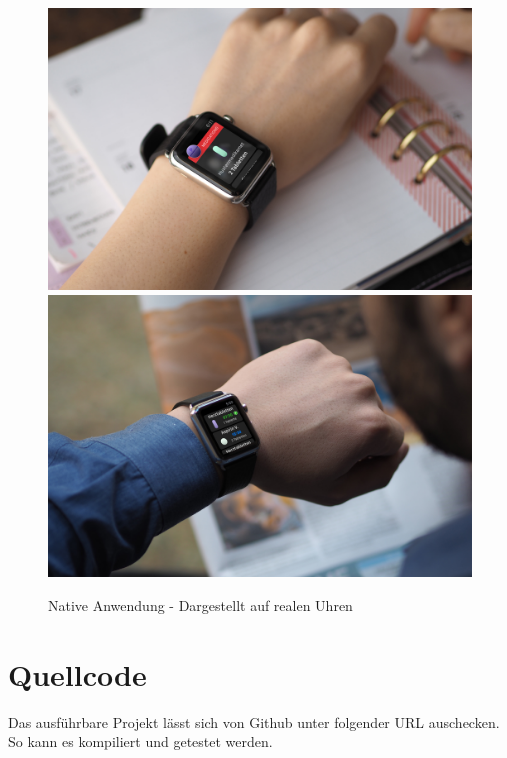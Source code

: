 \begin{figure}
	\caption{Native Anwendung - Dargestellt auf realen Uhren}
	\label{fig:watch-real}
	\centering
	\includegraphics[width=1\textwidth]{04_realisation/screenshots/Mockup-Generated-by-Dunnnk.jpg}
	\includegraphics[width=1\textwidth]{04_realisation/screenshots/Mockup-Generated-by-Dunnnk-2.jpg}
	\end{figure}
\section{Quellcode}
Das ausführbare Projekt lässt sich von Github unter folgender URL\cite{Schmidt:repoCode} auschecken. So kann es kompiliert und getestet werden. 

